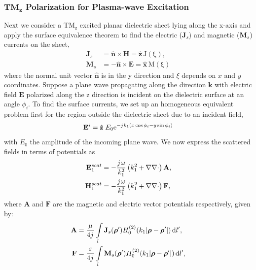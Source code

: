 \documentclass{ieeeaccess}
\renewcommand{\v}[1]{\mathbf{#1}} %
\renewcommand{\O}{\omega}  %
\newcommand{\E}{\varepsilon}  %
\renewcommand{\u}{\mu}  %
\newcommand{\p}{\rho}  %
\newcommand{\vp}{\boldsymbol \p}  %
\newcommand{\x}{\times}  %
\renewcommand{\del}{\nabla}  %
\renewcommand{\^}{\hat}  %
\newcommand*\diff{\mathop{}\!\mathrm{d}} %
\newcommand{\e}{\mathrm{e}} %
\renewcommand{\j}{{j}\mkern1mu} %
\begin{document}
\subsubsection{$\mathbf{TM_z}$ Polarization for Plasma-wave Excitation}
%
Next we consider a $\mathrm{TM_z}$ excited planar dielectric sheet lying along the x-axis and apply the surface equivalence theorem to find the electric ($\v J_s$) and magnetic  ($\v M_s$) currents on the sheet,
\setcounter{equation}{12}
\begin{subequations}
  \begin{align}
    \v J_s &=  \hat{\v{n}} \x \v{H} = \hat {\v{z}} \, \mathrm{J(\xi)},
    \label{eq:J_s}\\
    \v M_s &=  -\hat{\v{n}} \x \v{E} = \hat {\v{x}} \, \mathrm{M(\xi)}
    \label{eq:M_s}
  \end{align}
  \label{eq:eq_currents}%
\end{subequations}%
%
where the normal unit vector $\hat{\v{n}}$ is in the y direction and $\xi$ depends on $x$ and $y$ coordinates. Suppose a plane wave propagating along the direction $\v{k}$ with electric field $\v{E}$ polarized along the z direction is incident on the dielectric surface at an angle $\phi_i$. To find the surface currents, we set up an homogeneous equivalent problem first for the region outside the dielectric sheet due to an incident field,
%
\begin{equation}
  \v E^i = \hat{\v z} \; E_0  \e^{-\j k_1 (x \cos \phi_i - y \sin \phi_i)}
  \label{eq:E_i}
\end{equation}
%
with $E_0$ the amplitude of the incoming plane wave. We now express the scattered fields in terms of potentials as
%
\begin{subequations}
  \begin{align}
    \v E_1^{scat} &=  -\frac{\j \O}{k_1^2}\left( k_1^2 + \del \del \cdot \right) \v A,
    \label{eq:E1scat}\\
    \v H_1^{scat} &=  -\frac{\j \O}{k_1^2}\left( k_1^2 + \del \del \cdot \right) \v F,
    \label{eq:H1scat}
  \end{align}
  \label{eq:1scat_pot}%
\end{subequations}%
%
where $\v A$ and $\v F$ are the magnetic and electric vector potentials respectively, given by:
%
\begin{subequations}
  \begin{align}
    \v A &=  \frac{\u}{4 \j} \int\limits_{l} \v J_s(\vp') H_0^{(2)}(k_1 |\vp - \vp'|) \diff{l'},
    \label{eq:A}\\
    \v F &=  \frac{\E}{4 \j} \int\limits_{l} \v M_s(\vp') H_0^{(2)}(k_1 |\vp - \vp'|) \diff{l'},
    \label{eq:Fig}
  \end{align}
  \label{eq:potentials_2d}%
\end{subequations}%
\end{document}
